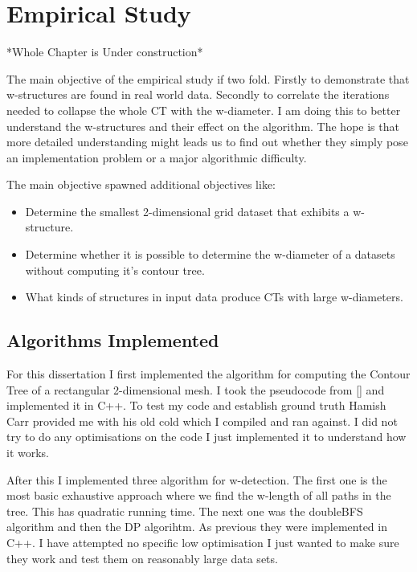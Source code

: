 \chapter{Empirical Study}
\label{chapter3}

*Whole Chapter is Under construction* 

The main objective of the empirical study if two fold. Firstly to demonstrate that w-structures are found in real world data. Secondly to correlate the iterations needed to collapse the whole CT with the w-diameter. I am doing this to better understand the w-structures and their effect on the algorithm. The hope is that more detailed understanding might leads us to find out whether they simply pose an implementation problem or a major algorithmic difficulty.

The main objective spawned additional objectives like:

\begin{itemize}
    \item Determine the smallest 2-dimensional grid dataset that exhibits a w-structure.
    \item Determine whether it is possible to determine the w-diameter of a datasets without computing it's contour tree.
    \item What kinds of structures in input data produce CTs with large w-diameters.
\end{itemize}



\section{Algorithms Implemented}

For this dissertation I first implemented the algorithm for computing the Contour Tree of a rectangular 2-dimensional mesh. I took the pseudocode from [] and implemented it in C++. To test my code and establish ground truth Hamish Carr provided me with his old cold which I compiled and ran against. I did not try to do any optimisations on the code I just implemented it to understand how it works.

After this I implemented three algorithm for w-detection. The first one is the most basic exhaustive approach where we find the w-length of all paths in the tree. This has quadratic running time. The next one was the doubleBFS algorithm and then the DP algorihtm. As previous they were implemented in C++. I have attempted no specific low optimisation I just wanted to make sure they work and test them on reasonably large data sets.


